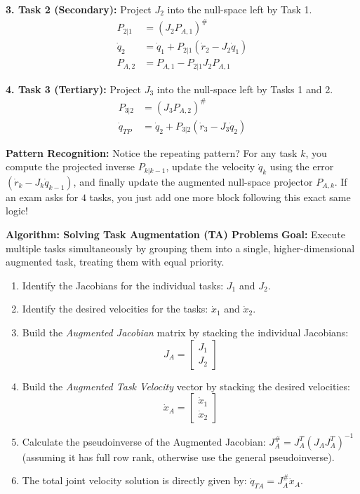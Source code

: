 \documentclass[11pt,a4paper]{article}
\begin{document}
\textbf{3. Task 2 (Secondary):} Project $J_2$ into the null-space left by Task 1.
\begin{align*}
    P_{2|1} &= (J_2 P_{A,1})^\# \\
    \dot{q}_2 &= \dot{q}_1 + P_{2|1} (\dot{r}_2 - J_2 \dot{q}_1) \\
    P_{A,2} &= P_{A,1} - P_{2|1} J_2 P_{A,1}
\end{align*}

\textbf{4. Task 3 (Tertiary):} Project $J_3$ into the null-space left by Tasks 1 and 2.
\begin{align*}
    P_{3|2} &= (J_3 P_{A,2})^\# \\
    \dot{q}_{TP} &= \dot{q}_2 + P_{3|2} (\dot{r}_3 - J_3 \dot{q}_2)
\end{align*}

\begin{examtip}
\textbf{Pattern Recognition:} Notice the repeating pattern? For any task $k$, you compute the projected inverse $P_{k|k-1}$, update the velocity $\dot{q}_k$ using the error $(\dot{r}_k - J_k \dot{q}_{k-1})$, and finally update the augmented null-space projector $P_{A,k}$. If an exam asks for $4$ tasks, you just add one more block following this exact same logic!
\end{examtip}
\textbf{Algorithm: Solving Task Augmentation (TA) Problems}
\textbf{Goal:} Execute multiple tasks simultaneously by grouping them into a single, higher-dimensional augmented task, treating them with equal priority.
\begin{enumerate}
    \item Identify the Jacobians for the individual tasks: $J_1$ and $J_2$.
    \item Identify the desired velocities for the tasks: $\dot{x}_1$ and $\dot{x}_2$.
    \item Build the \textit{Augmented Jacobian} matrix by stacking the individual Jacobians: 
    \begin{equation*}
        J_A = \begin{bmatrix} J_1 \\ J_2 \end{bmatrix}
    \end{equation*}
    \item Build the \textit{Augmented Task Velocity} vector by stacking the desired velocities: 
    \begin{equation*}
        \dot{x}_A = \begin{bmatrix} \dot{x}_1 \\ \dot{x}_2 \end{bmatrix}
    \end{equation*}
    \item Calculate the pseudoinverse of the Augmented Jacobian: $J_A^\# = J_A^T(J_A J_A^T)^{-1}$ (assuming it has full row rank, otherwise use the general pseudoinverse).
    \item The total joint velocity solution is directly given by: $\dot{q}_{TA} = J_A^\# \dot{x}_A$.
\end{enumerate}
\end{document}
